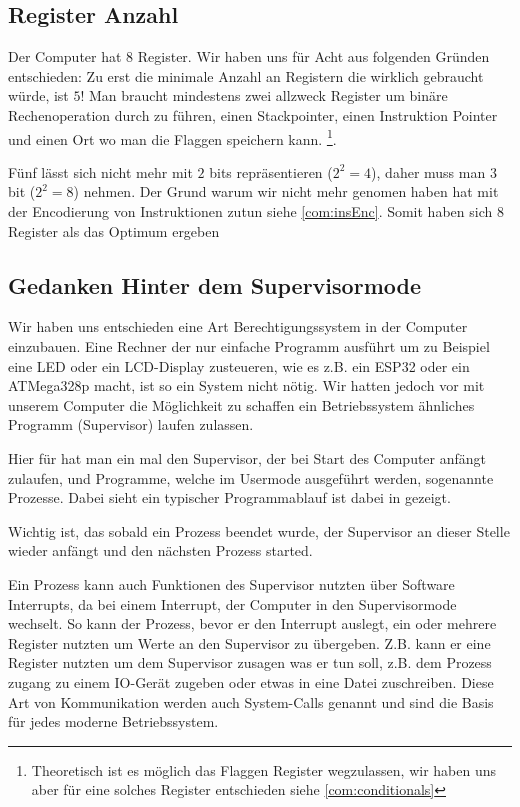 \documentclass{scrartcl}
\begin{document}
\subsection{\label{section:comment:register_number}Register Anzahl}

Der Computer hat 8 Register.
Wir haben uns für Acht aus folgenden Gründen entschieden:
Zu erst die minimale Anzahl an Registern die wirklich gebraucht würde, ist $5$! Man braucht mindestens zwei allzweck Register um binäre Rechenoperation durch zu führen, einen Stackpointer, einen Instruktion Pointer und einen Ort wo man die Flaggen speichern kann.
\footnote{Theoretisch ist es möglich das Flaggen Register wegzulassen, wir haben uns aber für eine solches Register entschieden siehe \autoref{com:conditionals}}.

Fünf lässt sich nicht mehr mit $2$ bits repräsentieren ($2^2 = 4$), daher muss man $3$ bit ($2^2 = 8$) nehmen.
Der Grund warum wir nicht mehr genomen haben hat mit der Encodierung von Instruktionen zutun siehe \autoref{com:insEnc}.
Somit haben sich $8$ Register als das Optimum ergeben

\subsection{\label{com:sup}Gedanken Hinter dem Supervisormode}

Wir haben uns entschieden eine Art Berechtigungssystem in der Computer einzubauen.
Eine Rechner der nur einfache Programm ausführt um zu Beispiel eine LED oder ein LCD-Display zusteueren, wie es z.B. ein ESP32 oder ein ATMega328p macht, ist so ein System nicht nötig.
Wir hatten jedoch vor mit unserem Computer die Möglichkeit zu schaffen ein Betriebssystem ähnliches Programm (Supervisor) laufen zulassen.

Hier für hat man ein mal den Supervisor, der bei Start des Computer anfängt zulaufen, und Programme, welche im Usermode ausgeführt werden, sogenannte Prozesse.
Dabei sieht ein typischer Programmablauf ist dabei in gezeigt.



Wichtig ist, das sobald ein Prozess beendet wurde, der Supervisor an dieser Stelle wieder anfängt und den nächsten Prozess started.

Ein Prozess kann auch Funktionen des Supervisor nutzten über Software Interrupts, da bei einem Interrupt, der Computer in den Supervisormode wechselt.
So kann der Prozess, bevor er den Interrupt auslegt, ein oder mehrere Register nutzten um Werte an den Supervisor zu übergeben.
Z.B. kann er eine Register nutzten um dem Supervisor zusagen was er tun soll, z.B. dem Prozess zugang zu einem IO-Gerät zugeben oder etwas in eine Datei zuschreiben.
Diese Art von Kommunikation werden auch System-Calls genannt und sind die Basis für jedes moderne Betriebssystem.
\end{document}
